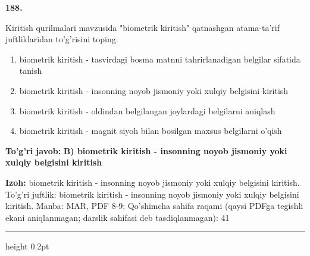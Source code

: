 \documentclass[10pt,a4paper]{article}
\begin{document}
{\bfseries\sffamily\color{ink} 188.}
\par
Kiritish qurilmalari mavzusida "biometrik kiritish" qatnashgan atama-ta'rif juftliklaridan to'g'risini toping.
\begin{enumerate}[label=\Alph*),leftmargin=9mm]
\item biometrik kiritish - tasvirdagi bosma matnni tahrirlanadigan belgilar sifatida tanish
\item biometrik kiritish - insonning noyob jismoniy yoki xulqiy belgisini kiritish
\item biometrik kiritish - oldindan belgilangan joylardagi belgilarni aniqlash
\item biometrik kiritish - magnit siyoh bilan bosilgan maxsus belgilarni o'qish
\end{enumerate}
\begin{tcolorbox}[enhanced,breakable,colback=teal!4,colframe=teal!60!black,boxrule=0.45pt,arc=1.2mm,left=2.7mm,right=2.7mm,top=1.8mm,bottom=1.8mm,before skip=2mm,after skip=2mm]
{\bfseries\sffamily\color{teal}To'g'ri javob:} \textbf{B) biometrik kiritish - insonning noyob jismoniy yoki xulqiy belgisini kiritish}
\par\smallskip
{\bfseries Izoh:} biometrik kiritish - insonning noyob jismoniy yoki xulqiy belgisini kiritish. To'g'ri juftlik: biometrik kiritish - insonning noyob jismoniy yoki xulqiy belgisini kiritish. Manba: MAR, PDF 8-9; Qo'shimcha sahifa raqami (qaysi PDFga tegishli ekani aniqlanmagan; darslik sahifasi deb tasdiqlanmagan): 41
\end{tcolorbox}
\vspace{2mm}\hrule height 0.2pt\vspace{3mm}
\end{document}
